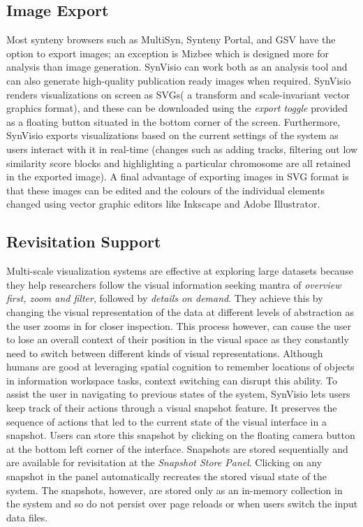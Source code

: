 \subsection{Image Export}
Most synteny browsers such as MultiSyn, Synteny Portal, and GSV\cite{baek2016multisyn,lee2016syntenyportal,revanna2011gsv} have the option to export images; an exception is Mizbee\cite{Meyer2009} which is designed more for analysis than image generation. SynVisio can work both as an analysis tool and can also generate high-quality publication ready images when required. SynVisio renders visualizations on screen as SVGs( a transform and scale-invariant vector graphics format), and these can be downloaded using the \textit{export toggle} provided as a floating button situated in the bottom corner of the screen. Furthermore, SynVisio exports visualizations based on the current settings of the system as users interact with it in real-time (changes such as adding tracks, filtering out low similarity score blocks and highlighting a particular chromosome are all retained in the exported image). A final advantage of exporting images in SVG format is that these images can be edited and the colours of the individual elements changed using vector graphic editors like Inkscape and Adobe Illustrator.

\subsection{Revisitation Support}
Multi-scale visualization systems are effective at exploring large datasets because they help researchers follow the visual information seeking mantra of \textit{overview first, zoom and filter}, followed by \textit{details on demand}\cite{Shneiderman96theeyes}. They achieve this by changing the visual representation of the data at different levels of abstraction as the user zooms in for closer inspection\cite{Stolte}. This process however, can cause the user to lose an overall context of their position in the visual space as they constantly need to switch between different kinds of visual representations.
Although humans are good at leveraging spatial cognition to remember locations of objects in information workspace tasks\cite{datamountain}, context switching can disrupt this ability. To assist the user in navigating to previous states of the system, SynVisio lets users keep track of their actions through a visual snapshot feature. It preserves the sequence of actions that led to the current state of the visual interface in a snapshot. Users can store this snapshot by clicking on the floating camera button at the bottom left corner of the interface. Snapshots are stored sequentially and are available for revisitation at the \textit{Snapshot Store Panel}. Clicking on any snapshot in the panel automatically recreates the stored visual state of the system. The snapshots, however, are stored only as an in-memory collection in the system and so do not persist over page reloads or when users switch the input data files.


